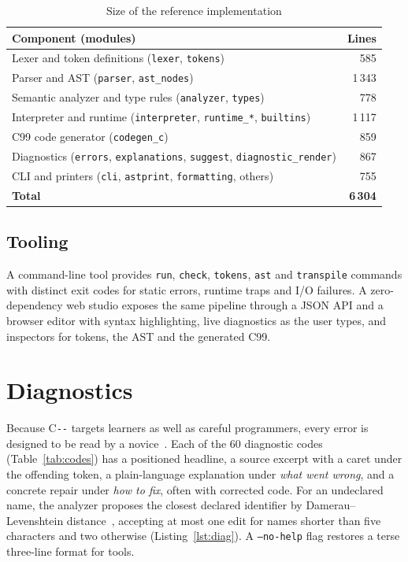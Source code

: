 \documentclass[conference]{IEEEtran}
\newcommand{\cmm}{C\texttt{-{}-}}
\begin{document}
\begin{table}[t]
\caption{Size of the reference implementation}
\label{tab:loc}
\centering
\footnotesize
\begin{tabular}{@{}l r@{}}
\toprule
\textbf{Component (modules)} & \textbf{Lines} \\
\midrule
Lexer and token definitions (\texttt{lexer}, \texttt{tokens}) & 585 \\
Parser and AST (\texttt{parser}, \texttt{ast\_nodes}) & 1\,343 \\
Semantic analyzer and type rules (\texttt{analyzer}, \texttt{types}) & 778 \\
Interpreter and runtime (\texttt{interpreter}, \texttt{runtime\_*}, \texttt{builtins}) & 1\,117 \\
C99 code generator (\texttt{codegen\_c}) & 859 \\
Diagnostics (\texttt{errors}, \texttt{explanations}, \texttt{suggest}, \texttt{diagnostic\_render}) & 867 \\
CLI and printers (\texttt{cli}, \texttt{astprint}, \texttt{formatting}, others) & 755 \\
\midrule
\textbf{Total} & \textbf{6\,304} \\
\bottomrule
\end{tabular}
\end{table}

\subsection{Tooling}
A command-line tool provides \texttt{run}, \texttt{check}, \texttt{tokens}, \texttt{ast} and
\texttt{transpile} commands with distinct exit codes for static errors, runtime traps and I/O failures.
A zero-dependency web studio exposes the same pipeline through a JSON API and a browser editor with syntax
highlighting, live diagnostics as the user types, and inspectors for tokens, the AST and the generated C99.

\section{Diagnostics}\label{sec:diag}
Because \cmm{} targets learners as well as careful programmers, every error is designed to be read by a
novice~\cite{becker2019}. Each of the 60 diagnostic codes (Table~\ref{tab:codes}) has a positioned headline,
a source excerpt with a caret under the offending token, a plain-language explanation under
\emph{what went wrong}, and a concrete repair under \emph{how to fix}, often with corrected code. For an
undeclared name, the analyzer proposes the closest declared identifier by Damerau--Levenshtein
distance~\cite{damerau,levenshtein}, accepting at most one edit for names shorter than five characters and two
otherwise (Listing~\ref{lst:diag}). A \texttt{--no-help} flag restores a terse
three-line format for tools.
\end{document}
